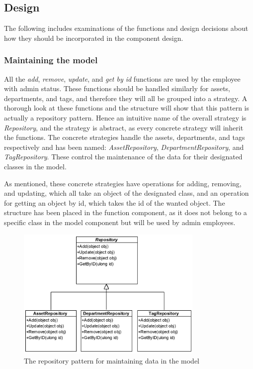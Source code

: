 \subsection{Design}
The following includes examinations of the functions and design decisions about how they should be incorporated in the component design.

\subsubsection{Maintaining the model}
All the \textit{add}, \textit{remove}, \textit{update}, and \textit{get by id} functions are used by the employee with admin status. These functions should be handled similarly for assets, departments, and tags, and therefore they will all be grouped into a strategy. A thorough look at these functions and the structure will show that this pattern is actually a repository pattern. Hence an intuitive name of the overall strategy is \textit{Repository}, and the strategy is abstract, as every concrete strategy will inherit the functions. The concrete strategies handle the assets, departments, and tags respectively and has been named: \textit{AssetRepository}, \textit{DepartmentRepository}, and \textit{TagRepository}. These control the maintenance of the data for their designated classes in the model.
\par
As mentioned, these concrete strategies have operations for adding, removing, and updating, which all take an object of the designated class, and an operation for getting an object by id, which takes the id of the wanted object. The structure has been placed in the function component, as it does not belong to a specific class in the model component but will be used by admin employees.
\begin{figure}[H]
    \centering
    \includegraphics[width=0.8\textwidth]{figures/FunctionComponent/Repository_pattern.png}
    \caption{The repository pattern for maintaining data in the model}
    \label{fig:RepositoryPattern}
\end{figure}

